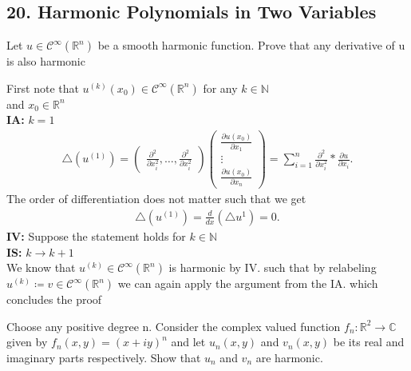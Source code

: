 \subsection*{20. Harmonic Polynomials in Two Variables}
\begin{exercise}[a]
 Let $u \in  \mathcal{C}^{\infty}(\mathbb{R}^{n} ) $ be a smooth harmonic function. Prove that any derivative of u is also harmonic
\end{exercise}
\begin{solution}
First note that $u^{(k)}(x_{0})  \in  \mathcal{C}^{\infty}(\mathbb{R}^{n} ) $ for any $k \in  \mathbb{N}$ \\ 
and $x_{0} \in  \mathbb{R}^{n} $ \\
\textbf{IA:} $k=1$
\begin{align*}
  \triangle (u^{(1)} ) = \begin{pmatrix} \frac{\partial ^2}{\partial x_i^2} , \ldots  , \frac{\partial ^2}{\partial x_i^2} \end{pmatrix}  \begin{pmatrix} \frac{\partial u(x_{0})}{\partial x_1} \\ \vdots \\ \frac{\partial u(x_{0})}{\partial x_n}\end{pmatrix}  = \sum_{i=1}^{n}  \frac{\partial ^2}{\partial x_i^2}* \frac{\partial u}{\partial x_i}  
.\end{align*}
The order of differentiation does not matter such that we get 
\begin{align*}
  \triangle (u^{(1)} ) = \frac{d}{dx} (\triangle u^{1} ) = 0
.\end{align*}
\textbf{IV:} Suppose the statement holds for $k \in  \mathbb{N}$ \\
\textbf{IS:} $k \to k+1$ \\
We know that $u^{(k)} \in \mathcal{C}^{\infty}(\mathbb{R}^{n} )  $ is harmonic by IV. such that by relabeling 
$u^{(k)}  \coloneqq  v \in \mathcal{C}^{\infty}(\mathbb{R}^{n} ) $ we can again apply the argument from the IA. which concludes the proof
\end{solution}
\begin{exercise}[b]
 Choose any positive degree n. Consider the complex valued function $f_n : \mathbb{R}^{2} \to  \mathbb{C}$ given by
$f_n(x, y) = (x+iy)^{n}$  and let $u_n(x, y)$ and $v_n(x, y)$ be its real and imaginary parts respectively.
Show that $u_n$ and $v_n$ are harmonic. 
\end{exercise}
